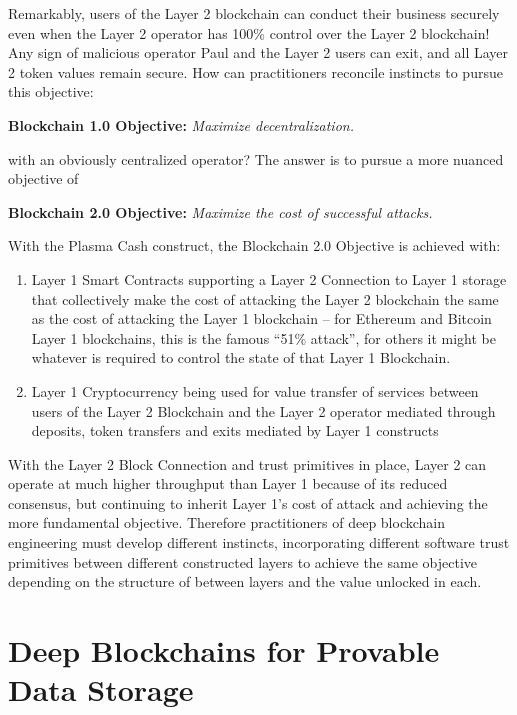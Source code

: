 \documentclass{article}
\begin{document}
Remarkably, users of the Layer 2 blockchain can conduct their business securely even when the Layer 2 operator has 100\% control over the Layer 2 blockchain!  Any sign of malicious operator Paul and the Layer 2 users can exit, and all Layer 2 token values remain secure.  How can practitioners reconcile instincts to pursue this objective:

\begin{center}
   {\bf Blockchain 1.0 Objective:} {\em Maximize decentralization.}
\end{center}

\noindent with an obviously centralized operator?   The answer is to pursue a more nuanced objective of

\begin{center}
   {\bf Blockchain 2.0 Objective:} {\em Maximize the cost of successful attacks.}
\end{center}

With the Plasma Cash construct, the Blockchain 2.0 Objective is achieved with:
\begin{enumerate}
    \item Layer 1 Smart Contracts supporting a Layer 2 Connection to Layer 1 storage that collectively make the cost of attacking the Layer 2 blockchain the same as the cost of attacking the Layer 1 blockchain -- for Ethereum and Bitcoin Layer 1 blockchains, this is the famous ``51\% attack'', for others it might be whatever is required to control the state of that Layer 1 Blockchain.
    \item Layer 1 Cryptocurrency being used for value transfer of services between users of the Layer 2 Blockchain and the Layer 2 operator mediated through deposits, token transfers and exits mediated by Layer 1 constructs
\end{enumerate}
With the Layer 2 Block Connection and trust primitives in place, Layer 2 can operate at much higher throughput than Layer 1 because of its reduced consensus, but continuing to inherit Layer 1's cost of attack and achieving the more fundamental objective.  Therefore practitioners of deep blockchain engineering must develop different instincts, incorporating different software trust primitives between different constructed layers to achieve the same objective depending on the structure of between layers and the value unlocked in each.

\section{Deep Blockchains for Provable Data Storage}
\end{document}
